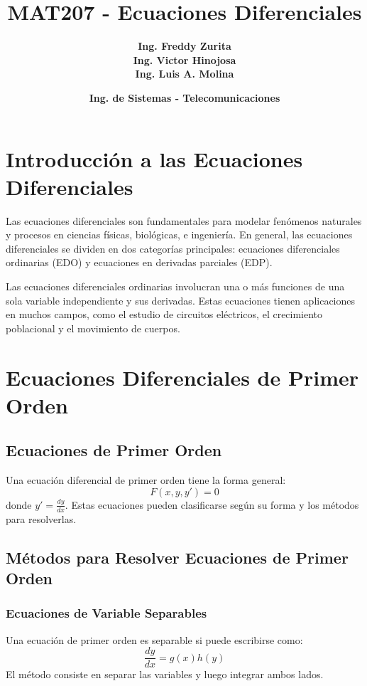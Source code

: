 \documentclass{article}
\title{MAT207 - Ecuaciones Diferenciales}
\author{\textbf{Ing. Freddy Zurita} \\ \textbf{Ing. Victor Hinojosa} \\ \textbf{Ing. Luis A. Molina}}
\date{\textbf{Ing. de Sistemas - Telecomunicaciones}}
\begin{document}
\maketitle  %


\tableofcontents
\newpage

\section{Introducción a las Ecuaciones Diferenciales}

Las ecuaciones diferenciales son fundamentales para modelar fenómenos naturales y procesos en ciencias físicas, biológicas, e ingeniería. En general, las ecuaciones diferenciales se dividen en dos categorías principales: ecuaciones diferenciales ordinarias (EDO) y ecuaciones en derivadas parciales (EDP). 

Las ecuaciones diferenciales ordinarias involucran una o más funciones de una sola variable independiente y sus derivadas. Estas ecuaciones tienen aplicaciones en muchos campos, como el estudio de circuitos eléctricos, el crecimiento poblacional y el movimiento de cuerpos.


\section{Ecuaciones Diferenciales de Primer Orden}

\subsection{Ecuaciones de Primer Orden}
Una ecuación diferencial de primer orden tiene la forma general:
\[
F(x, y, y') = 0
\]
donde \( y' = \frac{dy}{dx} \). Estas ecuaciones pueden clasificarse según su forma y los métodos para resolverlas.

\subsection{Métodos para Resolver Ecuaciones de Primer Orden}

\subsubsection{Ecuaciones de Variable Separables}
Una ecuación de primer orden es separable si puede escribirse como:
\[
\frac{dy}{dx} = g(x)h(y)
\]
El método consiste en separar las variables y luego integrar ambos lados.
\end{document}
